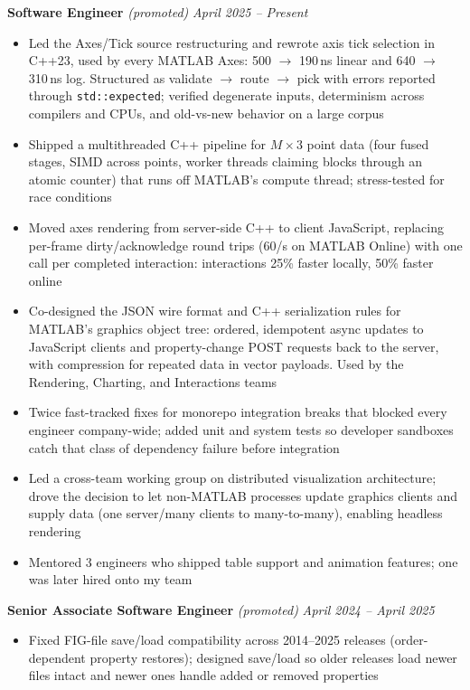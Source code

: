 \documentclass{article}
\begin{document}
{\large \textbf{Software Engineer}} \textit{(promoted)} \hfill \textit{April 2025 -- Present}
\begin{itemize}[leftmargin=*]
    \item Led the Axes/Tick source restructuring and rewrote axis tick selection in C++23, used by every MATLAB Axes: 500 $\to$ 190\,ns linear and 640 $\to$ 310\,ns log. Structured as validate $\to$ route $\to$ pick with errors reported through \texttt{std::expected}; verified degenerate inputs, determinism across compilers and CPUs, and old-vs-new behavior on a large corpus
    \item Shipped a multithreaded C++ pipeline for $M \times 3$ point data (four fused stages, SIMD across points, worker threads claiming blocks through an atomic counter) that runs off MATLAB's compute thread; stress-tested for race conditions
    \item Moved axes rendering from server-side C++ to client JavaScript, replacing per-frame dirty/acknowledge round trips (60/s on MATLAB Online) with one call per completed interaction: interactions 25\% faster locally, 50\% faster online
    \item Co-designed the JSON wire format and C++ serialization rules for MATLAB's graphics object tree: ordered, idempotent async updates to JavaScript clients and property-change POST requests back to the server, with compression for repeated data in vector payloads. Used by the Rendering, Charting, and Interactions teams
    \item Twice fast-tracked fixes for monorepo integration breaks that blocked every engineer company-wide; added unit and system tests so developer sandboxes catch that class of dependency failure before integration
    \item Led a cross-team working group on distributed visualization architecture; drove the decision to let non-MATLAB processes update graphics clients and supply data (one server\slash many clients to many-to-many), enabling headless rendering
    \item Mentored 3 engineers who shipped table support and animation features; one was later hired onto my team
\end{itemize}

{\large \textbf{Senior Associate Software Engineer}} \textit{(promoted)} \hfill \textit{April 2024 -- April 2025}
\begin{itemize}[leftmargin=*]
    \item Fixed FIG-file save/load compatibility across 2014--2025 releases (order-dependent property restores); designed save/load so older releases load newer files intact and newer ones handle added or removed properties
\end{itemize}
\end{document}
